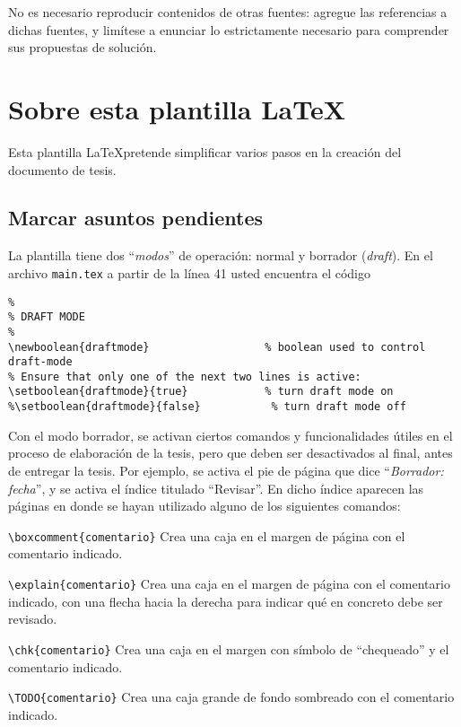 No es necesario reproducir contenidos de otras fuentes: agregue las referencias
a dichas fuentes, y limítese a enunciar lo estrictamente necesario para
comprender sus propuestas de solución.

\section{Sobre esta plantilla \LaTeX}

Esta plantilla \LaTeX pretende simplificar varios pasos en la creación del
documento de tesis.

\subsection{Marcar asuntos pendientes}

La plantilla tiene dos ``\emph{modos}'' de operación: normal y borrador
(\emph{draft}).  En el archivo \texttt{main.tex} a partir de la línea 41 usted
encuentra el código

\begin{verbatim}
%
% DRAFT MODE
%
\newboolean{draftmode}                  % boolean used to control draft-mode
% Ensure that only one of the next two lines is active:
\setboolean{draftmode}{true}            % turn draft mode on
%\setboolean{draftmode}{false}           % turn draft mode off
\end{verbatim}

Con el modo borrador, se activan ciertos comandos y funcionalidades útiles en
el proceso de elaboración de la tesis, pero que deben ser desactivados al
final, antes de entregar la tesis.  Por ejemplo, se activa el pie de página que
dice ``\emph{Borrador: fecha}'', y se activa el índice titulado ``Revisar''.  En dicho índice aparecen las páginas en donde se hayan utilizado alguno de los siguientes comandos:
\begin{compactitem}
\item \verb+\boxcomment{comentario}+ Crea una caja en el margen de página con
  el comentario indicado.
\item \verb+\explain{comentario}+ Crea una caja en el margen de página con
  el comentario indicado, con una flecha hacia la derecha para indicar qué en
  concreto debe ser revisado.
\item \verb+\chk{comentario}+ Crea una caja en el margen con símbolo de
  ``chequeado'' y el comentario indicado.
\item \verb+\TODO{comentario}+ Crea una caja grande de fondo sombreado con el
  comentario indicado.
\end{compactitem}

